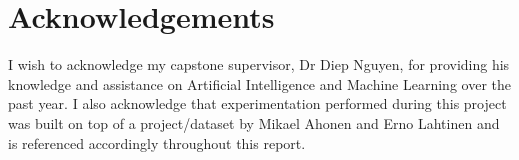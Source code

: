 \chapter*{Acknowledgements}
I wish to acknowledge my capstone supervisor, Dr Diep Nguyen, for providing his knowledge and
assistance on Artificial Intelligence and Machine Learning over the past year. 
I also acknowledge that experimentation performed during this project was built on top
of a project/dataset by Mikael Ahonen and Erno Lahtinen and is referenced accordingly 
throughout this report.